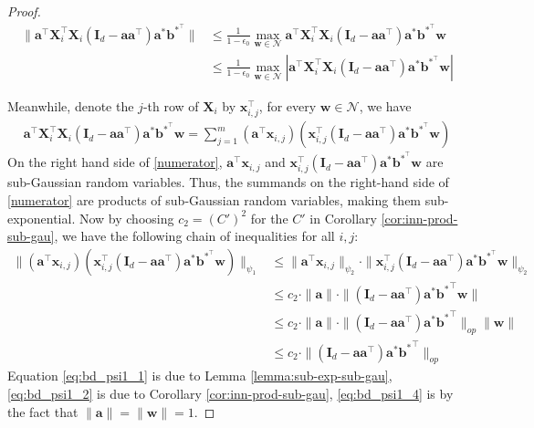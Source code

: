 \documentclass{article}
\theoremstyle{plain}
\theoremstyle{definition}
\theoremstyle{remark}
\begin{document}
\begin{proof}
\begin{align}
    \lVert \mathbf{a}^\top \mathbf{X}_i^\top \mathbf{X}_i (\mathbf{I}_d - \mathbf{a}\mathbf{a}^\top)\mathbf{a}^*\mathbf{b}^{*^\top}\rVert &\le \frac{1}{1-\epsilon_0} \max_{\mathbf{w}\in \mathcal N}  \mathbf{a}^\top \mathbf{X}_i^\top \mathbf{X}_i (\mathbf{I}_d - \mathbf{a}\mathbf{a}^\top)\mathbf{a}^*\mathbf{b}^{*^\top}\mathbf{w}\\
    &\le \frac{1}{1-\epsilon_0} \max_{\mathbf{w}\in \mathcal N}  |\mathbf{a}^\top \mathbf{X}_i^\top \mathbf{X}_i (\mathbf{I}_d - \mathbf{a}\mathbf{a}^\top)\mathbf{a}^*\mathbf{b}^{*^\top}\mathbf{w}| \label{eps-numerator}
\end{align}


Meanwhile, denote the $j$-th row of $\mathbf{X}_{i}$ by $\mathbf{x}_{i,j}^\top$, for every $\mathbf w \in \mathcal N$, we have
\begin{align}
    \mathbf{a}^\top \mathbf{X}_i^\top \mathbf{X}_i (\mathbf{I}_d - \mathbf{a}\mathbf{a}^\top)\mathbf{a}^*\mathbf{b}^{*^\top}\mathbf{w} = \sum_{j=1}^{m} (\mathbf{a}^\top \mathbf{x}_{i,j})(\mathbf{x}_{i,j}^\top(\mathbf{I}_d - \mathbf{a}\mathbf{a}^\top)\mathbf{a}^*\mathbf{b}^{*^\top}\mathbf{w}) \label{numerator}
\end{align}
 On the right hand side of \eqref{numerator}, $\mathbf{a}^\top \mathbf{x}_{i,j}$ and $\mathbf{x}_{i,j}^\top(\mathbf{I}_d - \mathbf{a}\mathbf{a}^\top)\mathbf{a}^*\mathbf{b}^{*^\top}\mathbf{w}$ are sub-Gaussian random variables. Thus, the summands on the right-hand side of \eqref{numerator} are products of sub-Gaussian random variables, making them sub-exponential. Now by choosing $c_2 = (C')^2$ for the $C'$ in Corollary \ref{cor:inn-prod-sub-gau}, we have the following chain of inequalities for all $i, j$:
\begin{align}
\|(\mathbf{a}^\top \mathbf{x}_{i,j})(\mathbf{x}_{i,j}^\top(\mathbf{I}_d - \mathbf{a}\mathbf{a}^\top)\mathbf{a}^*\mathbf{b}^{*^\top}\mathbf{w})\|_{\psi_1} &\le \|\mathbf{a}^\top \mathbf{x}_{i,j} \|_{\psi_2} \cdot \| \mathbf{x}_{i,j}^\top (\mathbf{I}_d - \mathbf{a}\mathbf{a}^\top)\mathbf{a}^*\mathbf b^{*^\top} \mathbf w \|_{\psi_2}\label{eq:bd_psi1_1}\\
&\le c_2\cdot \| \mathbf{a} \|  \cdot \| (\mathbf I_d - \mathbf{aa}^\top) \mathbf a^*  {\mathbf{b}^{*}}^\top \mathbf w \| \label{eq:bd_psi1_2}\\
& \le  c_2\cdot \| \mathbf{a} \|  \cdot \| (\mathbf I_d - \mathbf{aa}^\top) \mathbf a^*  {\mathbf{b}^{*}}^\top \|_{op} \|\mathbf w \|\label{eq:bd_psi1_3}\\
& \le  c_2  \cdot \| (\mathbf I_d - \mathbf{aa}^\top) \mathbf a^*  {\mathbf{b}^{*}}^\top \|_{op} \label{eq:bd_psi1_4}
\end{align}
Equation \eqref{eq:bd_psi1_1} is due to Lemma \ref{lemma:sub-exp-sub-gau}, \eqref{eq:bd_psi1_2} is due to Corollary \ref{cor:inn-prod-sub-gau}, \eqref{eq:bd_psi1_4} is by the fact that $\|\mathbf a\| = \|\mathbf w\| = 1$.


\end{proof}
\end{document}
